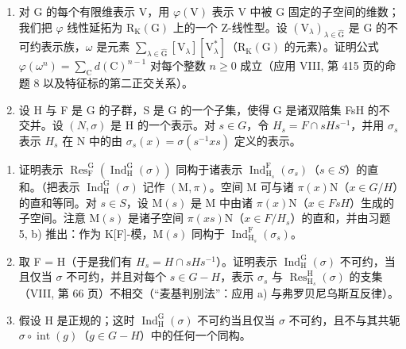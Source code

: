 \begin{enumerate}
\def\labelenumi{\arabic{enumi})}
\setcounter{enumi}{6}
\item
  对 G 的每个有限维表示 V，用 \(\varphi(\mathrm{V})\) 表示 V 中被 G 固定的子空间的维数；我们把 \(\varphi\) 线性延拓为 \(\mathrm{R}_{\mathrm{K}}(\mathrm{G})\) 上的一个 Z-线性型。设 \((\mathrm{V}_{\lambda})_{\lambda\in\widehat{\mathrm{G}}}\) 是 G 的不可约表示族，\(\omega\) 是元素 \(\sum_{\lambda\in\widehat{\mathrm{G}}}\left[\mathrm{V}_{\lambda}\right]\left[\mathrm{V}_{\lambda}^{*}\right]\)（\(\mathrm{R}_{\mathrm{K}}(\mathrm{G})\) 的元素）。证明公式 \(\varphi(\omega^{n})=\sum_{\mathrm{C}}d(\mathrm{C})^{n-1}\) 对每个整数 \(n\geqslant0\) 成立（应用 VIII, 第 415 页的命题 8 以及特征标的第二正交关系）。
\item
  设 H 与 F 是 G 的子群，S 是 G 的一个子集，使得 G 是诸双陪集 FsH 的不交并。设 \((N,\sigma)\) 是 H 的一个表示。对 \(s\in G\)，令 \(H_{s}=F\cap sHs^{-1}\)，并用 \(\sigma_{s}\) 表示 \(H_{s}\) 在 N 中的由 \(\sigma_{s}(x)=\sigma(s^{-1}xs)\) 定义的表示。
\end{enumerate}

\begin{enumerate}
\def\labelenumi{\alph{enumi})}
\item
  证明表示 \(\operatorname{Res}_{\mathrm{F}}^{\mathrm{G}}(\operatorname{Ind}_{\mathrm{H}}^{\mathrm{G}}(\sigma))\) 同构于诸表示 \(\operatorname{Ind}_{\mathrm{H}_{s}}^{\mathrm{F}}(\sigma_{s})\)（\(s \in S\)）的直和。（把表示 \(\operatorname{Ind}_{\mathrm{H}}^{\mathrm{G}}(\sigma)\) 记作 \((\mathrm{M}, \pi)\)。空间 M 可与诸 \(\pi(x)\mathrm{N}\)（\(x \in G/H\)）的直和等同。对 \(s \in S\)，设 \(\mathrm{M}(s)\) 是 M 中由诸 \(\pi(x)\mathrm{N}\)（\(x \in FsH\)）生成的子空间。注意 \(\mathrm{M}(s)\) 是诸子空间 \(\pi(xs)\mathrm{N}\)（\(x \in F/H_{s}\)）的直和，并由习题 5, b) 推出：作为 K{[}F{]}-模，\(\mathrm{M}(s)\) 同构于 \(\operatorname{Ind}_{\mathrm{H}_{s}}^{\mathrm{F}}(\sigma_{s})\)。
\item
  取 F = H（于是我们有 \(H_{s} = H \cap sHs^{-1}\)）。证明表示 \(\operatorname{Ind}_{\mathrm{H}}^{\mathrm{G}}(\sigma)\) 不可约，当且仅当 \(\sigma\) 不可约，并且对每个 \(s \in G - H\)，表示 \(\sigma_{s}\) 与 \(\operatorname{Res}_{\mathrm{H}_{s}}^{\mathrm{H}}(\sigma)\) 的支集（VIII, 第 66 页）不相交（“麦基判别法”：应用 a) 与弗罗贝尼乌斯互反律）。
\item
  假设 H 是正规的；这时 \(\operatorname{Ind}_{\mathrm{H}}^{\mathrm{G}}(\sigma)\) 不可约当且仅当 \(\sigma\) 不可约，且不与其共轭 \(\sigma \circ \operatorname{int}(g)\)（\(g \in G - H\)）中的任何一个同构。
\end{enumerate}

